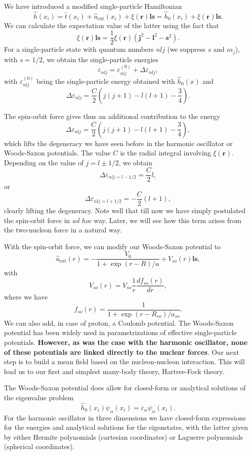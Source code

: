 \documentclass[%
oneside,                 %
final,                   %
10pt]{article}
\begin{document}
We have introduced a modified single-particle Hamiltonian
\[
\hat{h}(x_i) =  \hat{t}(x_i) + \hat{u}_{\mathrm{ext}}(x_i) +\xi(\bm{r})\bm{ls}=\hat{h}_0(x_i)+\xi(\bm{r})\bm{ls}. 
\]
We can calculate the expectation value of the latter using the fact that
\[
\xi(\bm{r})\bm{ls}=\frac{1}{2}\xi(\bm{r})\left(\bm{j}^2-\bm{l}^2-\bm{s}^2\right).
\]
For a single-particle state with quantum numbers $nlj$ (we suppress $s$ and $m_j$), with $s=1/2$, we obtain the single-particle energies
\[
\varepsilon_{nlj} = \varepsilon_{nlj}^{(0)}+\Delta\varepsilon_{nlj}, 
\]
with $\varepsilon_{nlj}^{(0)}$ being the single-particle energy obtained with $\hat{h}_0(x)$ and
\[
\Delta\varepsilon_{nlj}=\frac{C}{2}\left(j(j+1)-l(l+1)-\frac{3}{4}\right).
\]


The spin-orbit force gives thus an additional contribution to the energy
\[
\Delta\varepsilon_{nlj}=\frac{C}{2}\left(j(j+1)-l(l+1)-\frac{3}{4}\right),
\]
which lifts the degeneracy we have seen before in the harmonic oscillator or Woods-Saxon potentials. The value $C$ is the radial
integral involving $\xi(\bm{r})$. Depending on the value of $j=l\pm 1/2$, we obtain 
\[
\Delta\varepsilon_{nlj=l-1/2}=\frac{C}{2}l,
\]
or
\[
\Delta\varepsilon_{nlj=l+1/2}=-\frac{C}{2}(l+1),
\]
clearly lifting the degeneracy. Note well that till now we have simply postulated the spin-orbit force in \emph{ad hoc} way.
Later, we will see how this term arises from the two-nucleon force in a natural way. 


With the spin-orbit force, we can modify our Woods-Saxon potential to 
\[
\hat{u}_{\mathrm{ext}}(r)=-\frac{V_0}{1+\exp{(r-R)/a}}+V_{so}(r)\bm{ls},
\]
with
\[
V_{so}(r) = V_{so}\frac{1}{r}\frac{d f_{so}(r)}{dr},
\]
where we have 
\[
f_{so}(r) = \frac{1}{1+\exp{(r-R_{so})/a_{so}}}.
\]
We can also add, in case of proton, a Coulomb potential. The Woods-Saxon potential has been widely used in parametrizations of
effective single-particle potentials. \textbf{However, as was the case with the harmonic oscillator, none of these potentials are linked directly to the nuclear forces}. Our next step is to build a mean field based on the nucleon-nucleon interaction.
This will lead us to our first and simplest many-body theory, Hartree-Fock theory.  


The Woods-Saxon potential does allow for closed-form or analytical solutions of the eigenvalue problem
\[
  \hat{h}_0(x_i)\psi_{\alpha}(x_i)=\varepsilon_{\alpha}\psi_{\alpha}(x_i).  
\]
For the harmonic oscillator in three dimensions we have closed-form expressions for the energies and analytical solutions for the eigenstates,
with the latter given by either Hermite polynomials (cartesian coordinates) or Laguerre polynomials (spherical coordinates).
\end{document}
